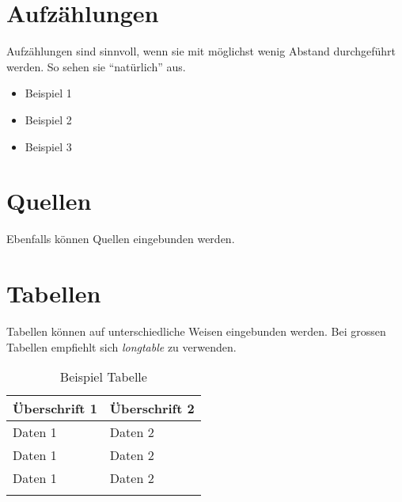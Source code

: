 \section{Aufzählungen}
\label{sec:Aufzählungen}

Aufzählungen sind sinnvoll, wenn sie mit möglichst wenig Abstand durchgeführt werden. So sehen sie ``natürlich'' aus.

\begin{itemize}[parsep=0pt]
    \item Beispiel 1
    \item Beispiel 2
    \item Beispiel 3
\end{itemize}

\section{Quellen}
\label{sec:Quellen}

Ebenfalls können Quellen \parencite{beispiel_atl} eingebunden werden.

\section{Tabellen}
\label{sec:Tabellen}

Tabellen können auf unterschiedliche Weisen eingebunden werden. Bei grossen Tabellen empfiehlt sich \textit{longtable} zu verwenden.

\begin{longtable}{p{7.0cm}p{5.0cm}}
    \hline
    \rowcolor{MSBlauAk5H60}
    \textbf{Überschrift 1} & \textbf{Überschrift 2} \\ \hline
    Daten 1 & Daten 2 \\ \hline
    Daten 1 & Daten 2 \\ \hline
    Daten 1 & Daten 2 \\ \hline
    \caption{Beispiel Tabelle}\\  
\end{longtable}
